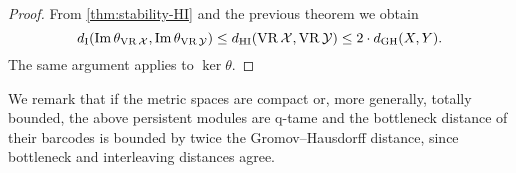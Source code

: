 \begin{proof}
        From \cref{thm:stability-HI} and the previous theorem we obtain
        \[
        d_{\mathrm{I}}(\operatorname{Im}\theta_{\operatorname{VR}\mathcal{X}}, \operatorname{Im}\theta_{\operatorname{VR}\mathcal{Y}}) \leq
        d_{\mathrm{HI}}(\operatorname{VR}\mathcal{X}, \operatorname{VR}\mathcal{Y}) \leq 2 \cdot d_{\mathrm{GH}}(X,Y).
        \]
        The same argument applies to $\ker\theta$.
\end{proof}

We remark that if the metric spaces are compact or, more generally, totally bounded, the above persistent modules are q-tame and the bottleneck distance of their barcodes is bounded by twice the Gromov--Hausdorff distance, since bottleneck and interleaving distances agree.
